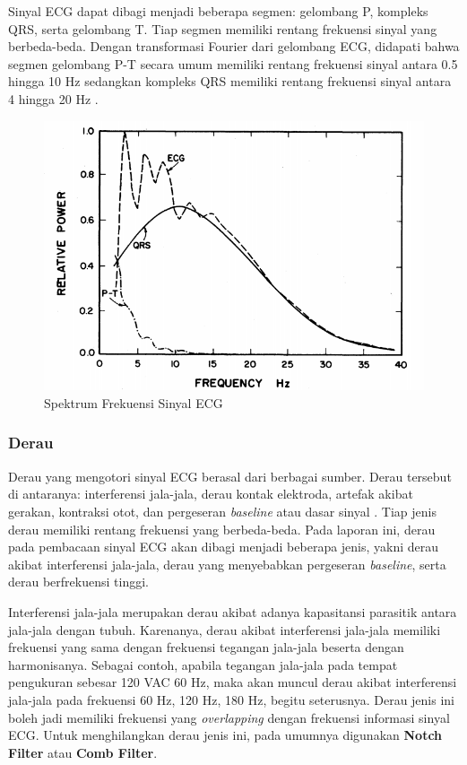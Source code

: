 \documentclass[11pt]{article}
\begin{document}
Sinyal ECG dapat dibagi menjadi beberapa segmen: gelombang P, kompleks QRS, serta gelombang T. Tiap segmen memiliki rentang frekuensi sinyal yang berbeda-beda. Dengan transformasi Fourier dari gelombang ECG, didapati bahwa segmen gelombang P-T secara umum memiliki rentang frekuensi sinyal antara 0.5 hingga 10 Hz sedangkan kompleks QRS memiliki rentang frekuensi sinyal antara 4 hingga 20 Hz \cite{thakor84}.

\begin{figure}[H]
\centerline{\includegraphics[scale=0.3]{figures/fig1-ecgspectrum.png}}
\caption{Spektrum Frekuensi Sinyal ECG \cite{thakor84}}
\end{figure}

\subsubsection{Derau}
Derau yang mengotori sinyal ECG berasal dari berbagai sumber. Derau tersebut di antaranya: interferensi jala-jala, derau kontak elektroda, artefak akibat gerakan, kontraksi otot, dan pergeseran \textit{baseline} atau dasar sinyal \cite{archarya14}. Tiap jenis derau memiliki rentang frekuensi yang berbeda-beda. Pada laporan ini, derau pada pembacaan sinyal ECG akan dibagi menjadi beberapa jenis, yakni derau akibat interferensi jala-jala, derau yang menyebabkan pergeseran \textit{baseline}, serta derau berfrekuensi tinggi.

Interferensi jala-jala merupakan derau akibat adanya kapasitansi parasitik antara jala-jala dengan tubuh. Karenanya, derau akibat interferensi jala-jala memiliki frekuensi yang sama dengan frekuensi tegangan jala-jala beserta dengan harmonisanya. Sebagai contoh, apabila tegangan jala-jala pada tempat pengukuran sebesar 120 VAC 60 Hz, maka akan muncul derau akibat interferensi jala-jala pada frekuensi 60 Hz, 120 Hz, 180 Hz, begitu seterusnya. Derau jenis ini boleh jadi memiliki frekuensi yang \textit{overlapping} dengan frekuensi informasi sinyal ECG. Untuk menghilangkan derau jenis ini, pada umumnya digunakan \textbf{Notch Filter} atau \textbf{Comb Filter}.
\end{document}
